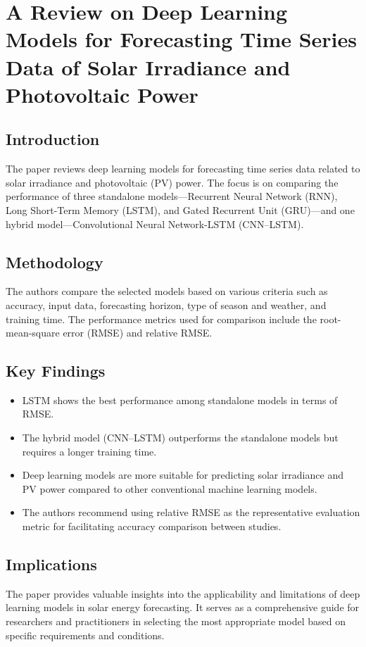 \documentclass{article}
\begin{document}
\newpage
\section{A Review on Deep Learning Models for Forecasting Time Series Data of Solar Irradiance and Photovoltaic Power}

\subsection{Introduction}
The paper reviews deep learning models for forecasting time series data related to solar irradiance and photovoltaic (PV) power. The focus is on comparing the performance of three standalone models—Recurrent Neural Network (RNN), Long Short-Term Memory (LSTM), and Gated Recurrent Unit (GRU)—and one hybrid model—Convolutional Neural Network-LSTM (CNN–LSTM).

\subsection{Methodology}
The authors compare the selected models based on various criteria such as accuracy, input data, forecasting horizon, type of season and weather, and training time. The performance metrics used for comparison include the root-mean-square error (RMSE) and relative RMSE.

\subsection{Key Findings}
\begin{itemize}
    \item LSTM shows the best performance among standalone models in terms of RMSE.
    \item The hybrid model (CNN–LSTM) outperforms the standalone models but requires a longer training time.
    \item Deep learning models are more suitable for predicting solar irradiance and PV power compared to other conventional machine learning models.
    \item The authors recommend using relative RMSE as the representative evaluation metric for facilitating accuracy comparison between studies.
\end{itemize}

\subsection{Implications}
The paper provides valuable insights into the applicability and limitations of deep learning models in solar energy forecasting. It serves as a comprehensive guide for researchers and practitioners in selecting the most appropriate model based on specific requirements and conditions.
\end{document}
